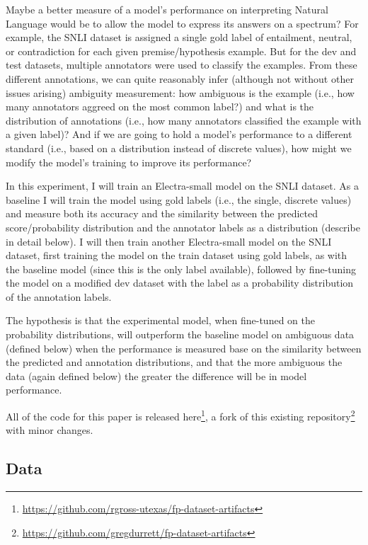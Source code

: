 \documentclass[11pt]{article}
\begin{document}
Maybe a better measure of a model's performance on interpreting Natural Language would be to allow the model
to express its answers on a spectrum? For example, the SNLI dataset is assigned a single gold label
of entailment, neutral, or contradiction for each given premise/hypothesis example. But for the dev and test
datasets, multiple annotators were used to classify the examples. From these different annotations, we can
quite reasonably infer (although not without other issues arising) ambiguity measurement: how ambiguous is
the example (i.e., how many annotators aggreed on the most common label?) and what is the distribution of
annotations (i.e., how many annotators classified the example with a given label)? And if we are going to
hold a model's performance to a different standard (i.e., based on a distribution instead of discrete values),
how might we modify the model's training to improve its performance?

In this experiment, I will train an Electra-small model on the SNLI dataset. As a baseline I will train the
model using gold labels (i.e., the single, discrete values) and measure both its accuracy and the similarity
between the predicted score/probability distribution and the annotator labels as a distribution (describe in
detail below). I will then train another Electra-small model on the SNLI dataset, first training the model
on the train dataset using gold labels, as with the baseline model (since this is the only label available),
followed by fine-tuning the model on a modified dev dataset with the label as a probability distribution of
the annotation labels.

The hypothesis is that the experimental model, when fine-tuned on the probability distributions, will outperform
the baseline model on ambiguous data (defined below) when the performance is measured base on the similarity
between the predicted and annotation distributions, and that the more ambiguous the data (again defined below)
the greater the difference will be in model performance.

All of the code for this paper is released here\footnote{\url{https://github.com/rgross-utexas/fp-dataset-artifacts}},
a fork of this existing repository\footnote{\url{https://github.com/gregdurrett/fp-dataset-artifacts}} with
minor changes.

\subsection{Data}
\end{document}
